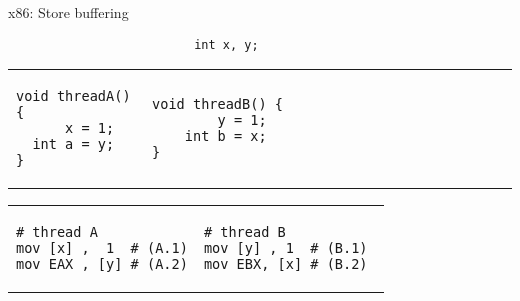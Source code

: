 \begin{frame}[fragile,t]{x86: Store buffering}


\begin{verbatim}
                          int x, y;
\end{verbatim}

\begin{tabular}{p{} p{}}

\begin{verbatim}
void threadA() {
      x = 1;
  int a = y;
}
\end{verbatim}

& 

\begin{verbatim}
void threadB() {                                   
        y = 1;                           
    int b = x;                           
}                    
\end{verbatim}
\end{tabular}


\pause



\begin{tabular}{p{} p{}}
\begin{verbatim}
# thread A
mov [x] ,  1  # (A.1)
mov EAX , [y] # (A.2)
\end{verbatim}

& 

\begin{verbatim}
# thread B          
mov [y] , 1  # (B.1) 
mov EBX, [x] # (B.2) 
\end{verbatim}
\end{tabular}

\end{frame}


